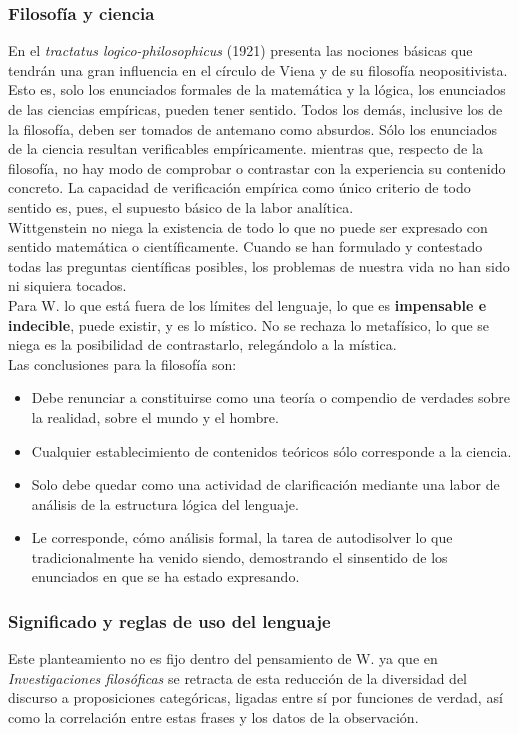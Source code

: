 \documentclass[a4paper, 11pt, twocolumn, spanish]{article}
\begin{document}
\subsubsection{Filosofía y ciencia}
\label{sec:org349cb10}
En el \emph{tractatus logico-philosophicus} (1921) presenta las nociones
básicas que tendrán una gran influencia en el círculo de Viena y de su
filosofía neopositivista. Esto es, solo los enunciados formales de la
matemática y la lógica, los enunciados de las ciencias empíricas,
pueden tener sentido. Todos los demás, inclusive los de la filosofía,
deben ser tomados de antemano como absurdos. Sólo los enunciados de la
ciencia resultan verificables empíricamente. mientras que, respecto de
la filosofía, no hay modo de comprobar o contrastar con la experiencia
su contenido concreto. La capacidad de verificación empírica como
único criterio de todo sentido es, pues, el supuesto básico de la
labor analítica.\\

Wittgenstein no niega la existencia de todo lo que no puede ser
expresado con sentido matemática o científicamente. Cuando se han
formulado y contestado todas las preguntas científicas posibles, los
problemas de nuestra vida no han sido ni siquiera tocados.\\

Para W. lo que está fuera de los límites del lenguaje, lo que es
\textbf{impensable e indecible}, puede existir, y es lo místico. No se
rechaza lo metafísico, lo que se niega es la posibilidad de
contrastarlo, relegándolo a la mística.\\

Las conclusiones para la filosofía son:
\begin{itemize}
\item Debe renunciar a constituirse como una teoría o compendio de
verdades sobre la realidad, sobre el mundo y el hombre.
\item Cualquier establecimiento de contenidos teóricos sólo corresponde
a la ciencia.
\item Solo debe quedar como una actividad de clarificación mediante una
labor de análisis de la estructura lógica del lenguaje.
\item Le corresponde, cómo análisis formal, la tarea de autodisolver lo
que tradicionalmente ha venido siendo, demostrando el sinsentido
de los enunciados en que se ha estado expresando.
\end{itemize}

\subsubsection{Significado y reglas de uso del lenguaje}
\label{sec:orgdab613e}
Este planteamiento no es fijo dentro del pensamiento de W. ya que en
\emph{Investigaciones filosóficas} se retracta de esta reducción de la
diversidad del discurso a proposiciones categóricas, ligadas entre sí
por funciones de verdad, así como la correlación entre estas frases y
los datos de la observación.\\
\end{document}
